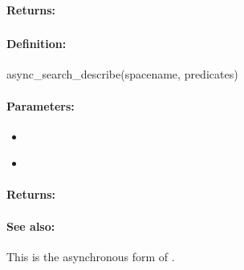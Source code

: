 \paragraph{Returns:}


\pagebreak
\subsubsection{}
\label{api:ruby:async_search_describe}


\paragraph{Definition:}
\begin{rubycode}
async_search_describe(spacename, predicates)
\end{rubycode}

\paragraph{Parameters:}
\begin{itemize}[noitemsep]
\item {}\\

\item {}\\

\end{itemize}

\paragraph{Returns:}


\paragraph{See also:}  This is the asynchronous form of .

\pagebreak
\subsubsection{}
\label{api:ruby:sorted_search}


